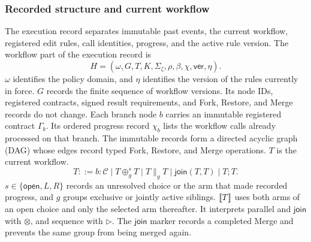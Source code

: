 \subsubsection{Recorded structure and current workflow}
The execution record separates immutable past events, the current workflow, registered edit rules, call identities, progress, and the active rule version.
The workflow part of the execution record is
\begin{equation}
\label{eq:history-state}
 H=(\omega,G,T,K,\Sigma_\zeta,\rho,\beta,\chi,\mathsf{ver},\eta).
\end{equation}
\(\omega\) identifies the policy domain, and \(\eta\) identifies the version of the rules currently in force.
\(G\) records the finite sequence of workflow versions.
Its node IDs, registered contracts, signed result requirements, and Fork, Restore, and Merge records do not change.
Each branch node \(b\) carries an immutable registered contract \(\Gamma_b\).
Its ordered progress record \(\chi_b\) lists the workflow calls already processed on that branch.
The immutable records form a directed acyclic graph (DAG) whose edges record typed Fork, Restore, and Merge operations.
\(T\) is the current workflow.
\[
 T ::= b{:}\mathcal C
     \mid T\oplus_g^s T
     \mid T\parallel_g T
     \mid \mathsf{join}(T,T)
     \mid T;T .
\]
\(s\in\{\mathsf{open},L,R\}\) records an unresolved choice or the arm that made recorded progress, and \(g\) groups exclusive or jointly active siblings.
\(\mathopen{[\![}T\mathclose{]\!]}\) uses both arms of an open choice and only the selected arm thereafter.
It interprets parallel and \(\mathsf{join}\) with \(\otimes\), and sequence with \(\triangleright\).
The \(\mathsf{join}\) marker records a completed Merge and prevents the same group from being merged again.

